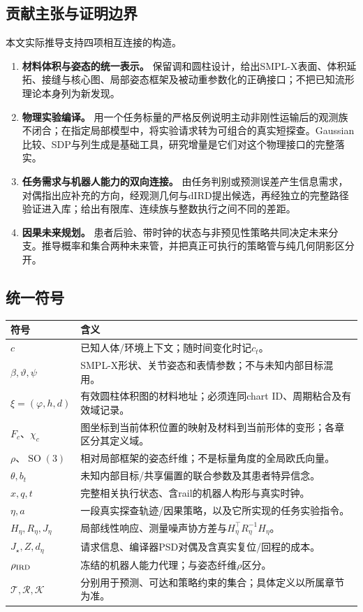\documentclass[11pt,a4paper]{article}
\numberwithin{equation}{section}
\theoremstyle{definition}
\DeclareMathOperator{\SO}{SO}
\begin{document}
\subsection{贡献主张与证明边界}
本文实际推导支持四项相互连接的构造。
\begin{enumerate}
 \item \textbf{材料体积与姿态的统一表示。} 保留调和圆柱设计，给出SMPL-X表面、体积延拓、接缝与核心图、局部姿态框架及被动重参数化的正确接口；不把已知流形理论本身列为新发现。
 \item \textbf{物理实验编译。} 用一个任务标量的严格反例说明主动非刚性运输后的观测族不闭合；在指定局部模型中，将实验请求转为可组合的真实短探查。Gaussian比较、SDP与列生成是基础工具，研究增量是它们对这个物理接口的完整落实。
 \item \textbf{任务需求与机器人能力的双向连接。} 由任务判别或预测误差产生信息需求，对偶指出应补充的方向，经观测几何与dIRD提出候选，再经独立的完整路径验证进入库；给出有限库、连续族与整数执行之间不同的差距。
 \item \textbf{因果未来规划。} 患者后验、带时钟的状态与非预见性策略共同决定未来分支。推导概率和集合两种未来管，并把真正可执行的策略管与纯几何阴影区分开。
\end{enumerate}

\subsection{统一符号}
{\small
\begin{longtable}{p{.20\linewidth}p{.72\linewidth}}
\toprule 符号 & 含义\\\midrule\endhead
$c$ & 已知人体/环境上下文；随时间变化时记$c_t$。\\
$\beta,\vartheta,\psi$ & SMPL-X形状、关节姿态和表情参数；不与未知内部目标混用。\\
$\xi=(\varphi,h,d)$ & 有效圆柱体积图的材料地址；必须连同chart ID、周期粘合及有效域记录。\\
$F_c$、$\chi_c$ & 图坐标到当前体积位置的映射及材料到当前形体的变形；各章区分其定义域。\\
$\rho$、$\SO(3)$ & 相对局部框架的姿态纤维；不是标量角度的全局欧氏向量。\\
$\theta,b_t$ & 未知内部目标/共享偏置的联合参数及其患者特异信念。\\
$x,q,t$ & 完整相关执行状态、含rail的机器人构形与真实时钟。\\
$\eta,a$ & 一段真实探查轨迹/因果策略，以及它所实现的任务实验指令。\\
$H_\eta,R_\eta,J_\eta$ & 局部线性响应、测量噪声协方差与$H_\eta^\top R_\eta^{-1}H_\eta$。\\
$J_\star,Z,d_\eta$ & 请求信息、编译器PSD对偶及含真实复位/回程的成本。\\
$\rho_{\rm IRD}$ & 冻结的机器人能力代理；与姿态纤维$\rho$区分。\\
$\mathcal T,\mathcal R,\mathcal K$ & 分别用于预测、可达和策略约束的集合；具体定义以所属章节为准。\\\bottomrule
\end{longtable}
}
\end{document}
